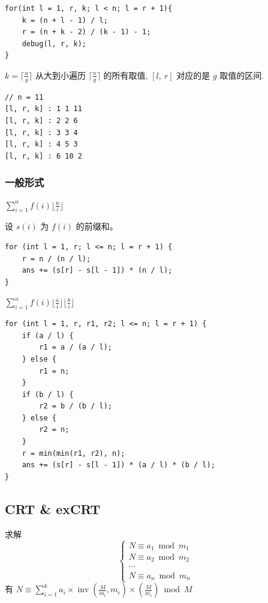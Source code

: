 \documentclass[UTF8, a4paper, titlepage, twoside]{ctexart}
\begin{document}
\begin{lstlisting}[style=cpp]
for(int l = 1, r, k; l < n; l = r + 1){
    k = (n + l - 1) / l;
    r = (n + k - 2) / (k - 1) - 1;
    debug(l, r, k);
}
\end{lstlisting}

$k = \lceil \frac{n}{g} \rceil$ 从大到小遍历 $\lceil \frac{n}{g} \rceil$ 的所有取值, $[l, \ r]$ 对应的是 $g$ 取值的区间.

\begin{lstlisting}[style=cpp]
// n = 11
[l, r, k] : 1 1 11 
[l, r, k] : 2 2 6 
[l, r, k] : 3 3 4 
[l, r, k] : 4 5 3 
[l, r, k] : 6 10 2 
\end{lstlisting}

\subsubsection*{ 一般形式 }

$\sum_{i=1}^n f(i)\lfloor \frac{n}{i} \rfloor$

设 $s(i)$ 为 $f(i)$ 的前缀和。

\begin{lstlisting}[style=cpp]
for (int l = 1, r; l <= n; l = r + 1) {
    r = n / (n / l);
    ans += (s[r] - s[l - 1]) * (n / l);
}
\end{lstlisting}

$\sum_{i = 1}^{n}f(i){\lfloor{\frac{a}{i}}\rfloor\lfloor{\frac{b}{i}}\rfloor}$

\begin{lstlisting}[style=cpp]
for (int l = 1, r, r1, r2; l <= n; l = r + 1) {
    if (a / l) {
        r1 = a / (a / l);
    } else {
        r1 = n;
    }
    if (b / l) {
        r2 = b / (b / l);
    } else {
        r2 = n;
    }
    r = min(min(r1, r2), n);
    ans += (s[r] - s[l - 1]) * (a / l) * (b / l);
}
\end{lstlisting}

\subsection{ CRT \& exCRT }

求解
$$
\left\{\begin{array}{ll}N \equiv a_{1} \bmod m_{1} \\ N \equiv a_{2} \bmod m_{2} \\  \cdots \\ N \equiv a_{n} \bmod m_{n}\end{array}\right.
$$
有 $N \equiv \sum\limits_{i=1}^{k} a_{i} \times \operatorname{inv}\left(\frac{M}{m_{i}}, m_{i}\right) \times\left(\frac{M}{m_{i}}\right)\bmod M$
\end{document}
